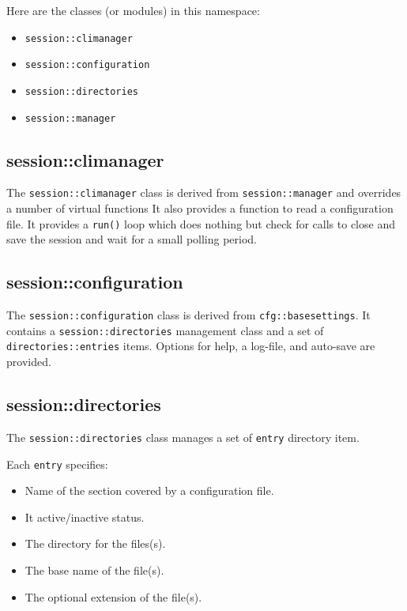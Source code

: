    Here are the classes (or modules) in this namespace:

   \begin{itemize}
      \item \texttt{session::climanager}
      \item \texttt{session::configuration}
      \item \texttt{session::directories}
      \item \texttt{session::manager}
   \end{itemize}

\subsection{session::climanager}
\label{subsec:session_namespace_climanager}

   The \texttt{session::climanager} class is derived from
   \texttt{session::manager} and overrides a number of virtual functions
   It also provides a function to read a configuration file.
   It provides a \texttt{run()} loop which does nothing
   but check for calls to close and save the session and wait for a small
   polling period.

\subsection{session::configuration}
\label{subsec:session_namespace_configuration}

   The \texttt{session::configuration} class is derived from
   \texttt{cfg::basesettings}.
   It contains a \texttt{session::directories} management class
   and a set of
   \texttt{directories::entries} items.
   Options for help, a log-file, and auto-save are provided.

\subsection{session::directories}
\label{subsec:session_namespace_directories}

   The \texttt{session::directories} class manages a set of
   \texttt{entry} directory item.

   Each \texttt{entry} specifies:

   \begin{itemize}
      \item Name of the section covered by a configuration file.
      \item It active/inactive status.
      \item The directory for the files(s).
      \item The base name of the file(s).
      \item The optional extension of the file(s).
   \end{itemize}

